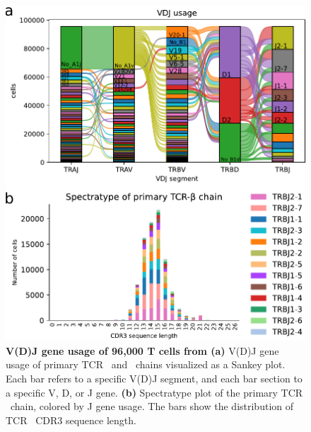 \documentclass{article}
\begin{document}
\newpage
\begin{figure}[H]
  \centering
  \includegraphics[width=7in]{../figures/gene_usage.pdf}
  \caption{\textbf{V(D)J gene usage of 96,000 T cells from \textcite{Wu2020-vp}} \textbf{(a)} V(D)J gene usage of primary TCR \textalpha\ and \textbeta\ chains visualized as a Sankey plot. Each bar refers to a specific V(D)J segment, and each bar section to a specific V, D, or J gene. \textbf{(b)} Spectratype plot of the primary TCR \textbeta\ chain, colored by J gene usage. The bars show the distribution of TCR \textbeta\ CDR3 sequence length.}
\end{figure}
\end{document}
